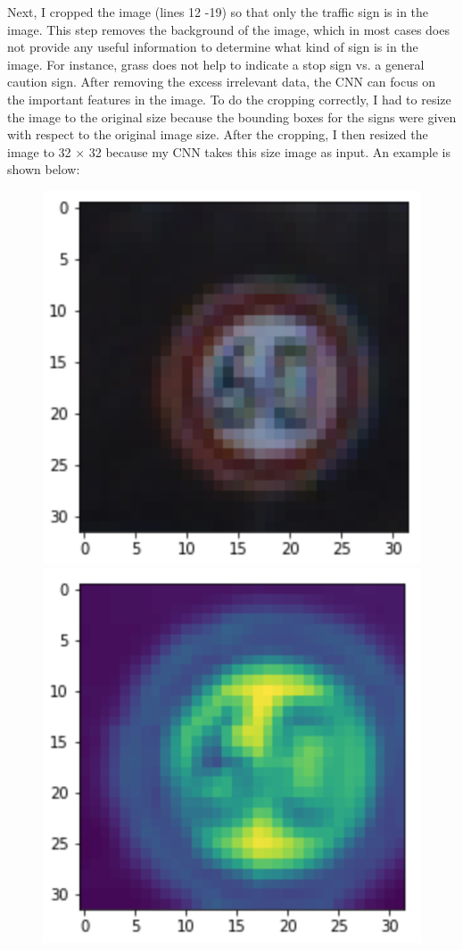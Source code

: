 \documentclass[12pt]{article}
\begin{document}
Next, I cropped the image (lines 12 -19) so that only the traffic sign is in the image. This step removes the background of the image, which in most cases does not provide any useful information to determine what kind of sign is in the image. For instance, grass does not help to indicate a stop sign vs. a general caution sign. After removing the excess irrelevant data, the CNN can focus on the important features in the image. To do the cropping correctly, I had to resize the image to the original size because the bounding boxes for the signs were given with respect to the original image size. After the cropping, I then resized the image to 32 $\times$ 32 because my CNN takes this size image as input. An example is shown below:
\begin{figure}[H]
\centering
\includegraphics[scale = 0.5]{writeup_images/im1.png}
\includegraphics[scale = 0.5]{writeup_images/cropped.png}

\end{figure}
\end{document}
